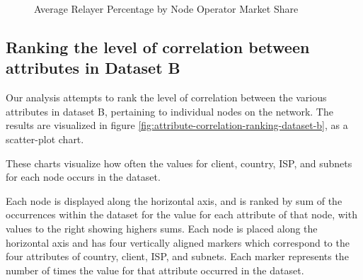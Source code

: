 \documentclass[conference]{IEEEtran}
\begin{document}
\begin{figure}[htbp]
  \centering
  \caption{Average Relayer Percentage by Node Operator Market Share}
  \label{fig:average_relayer_percentage_by_percentile}
\end{figure}

\subsection{Ranking the level of correlation between attributes in Dataset B}
\label{sec:ranking-the-level-of-correlation-between-attributes-in-dataset-b}

Our analysis attempts to rank the level of correlation between the various attributes in dataset B, pertaining to individual nodes on the network.  The results are visualized in figure \ref{fig:attribute-correlation-ranking-dataset-b}, as a scatter-plot chart.

These charts visualize how often the values for client, country, ISP, and subnets for each node occurs in the dataset.

Each node is displayed along the horizontal axis, and is ranked by sum of the occurrences within the dataset for the value for each attribute of that node, with values to the right showing highers sums.  Each node is placed along the horizontal axis and has four vertically aligned markers which correspond to the four attributes of country, client, ISP, and subnets.  Each marker represents the number of times the value for that attribute occurred in the dataset.
\end{document}
